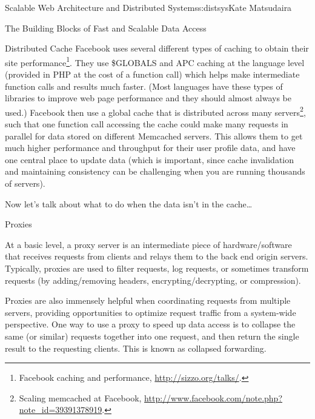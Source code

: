 \begin{aosachapter}{Scalable Web Architecture and Distributed Systems}{s:distsys}{Kate Matsudaira}
\begin{aosasect1}{The Building Blocks of Fast and Scalable Data Access}
\begin{aosasect2}{Distributed Cache}
Facebook uses several different types of caching to
obtain their site performance\footnote{Facebook caching and
performance, \url{http://sizzo.org/talks/}.}. They use \$GLOBALS and
APC caching at the language level (provided in PHP at the cost of a function call) which helps make intermediate
function calls and results much faster. (Most languages have these
types of libraries to improve web page performance and they should almost
always be used.) Facebook then use a global cache that is
distributed across many servers\footnote{Scaling memcached at
  Facebook,
  \url{http://www.facebook.com/note.php?note_id=39391378919}.}, such
that one function call accessing the cache could make many requests in
parallel for data stored on different Memcached servers. This allows
them to get much higher performance and throughput for their user
profile data, and have one central place to update data (which is
important, since cache invalidation and maintaining consistency can be
challenging when you are running thousands of servers).

Now let's talk about what to do when the data isn't in the cache{\ldots}

\end{aosasect2}

\begin{aosasect2}{Proxies}

At a basic level, a proxy server is an intermediate piece of
hardware/software that receives requests from clients and relays them
to the back end origin servers. Typically, proxies are used to filter
requests, log requests, or sometimes transform requests (by
adding/removing headers, encrypting/decrypting, or compression).


Proxies are also immensely helpful when coordinating requests from
multiple servers, providing opportunities to optimize request traffic
from a system-wide perspective. One way to use a proxy to speed up
data access is to collapse the same (or similar) requests together
into one request, and then return the single result to the requesting
clients. This is known as collapsed forwarding.


\end{aosasect2}
\end{aosasect1}
\end{aosachapter}
